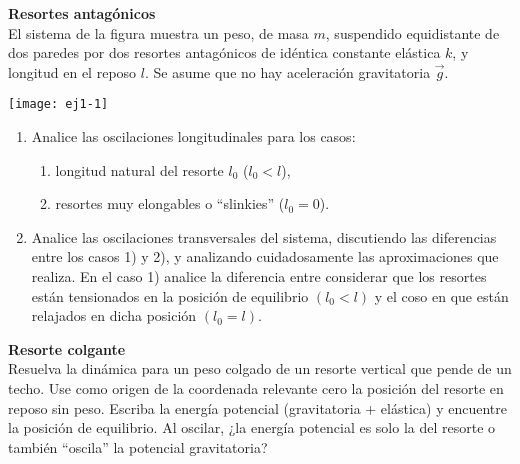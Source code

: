 \item
\begin{minipage}[t][1.9cm]{0.7\textwidth}
\textbf{Resortes antagónicos}\\
El sistema de la figura muestra un peso, de masa $m$, suspendido equidistante de dos paredes por dos resortes antagónicos de idéntica constante elástica $k$, y longitud en el reposo $l$.
Se asume que no hay aceleración gravitatoria $\vec{g}$.
\end{minipage}
\begin{minipage}[c][0cm][t]{0.25\textwidth}
  \texttt{[image: ej1-1]}
\end{minipage}
\begin{enumerate}
	\item Analice las oscilaciones longitudinales para los casos:   
	\begin{enumerate}
		\item longitud natural del resorte $l_0$ ($l_0 < l$),   
		\item resortes muy elongables o ``slinkies'' ($l_0 = 0$).   
	\end{enumerate}
	\item Analice las oscilaciones transversales del sistema, discutiendo las diferencias entre los casos 1) y 2), y analizando cuidadosamente las aproximaciones que realiza.
	En el caso 1) analice la diferencia entre considerar que los resortes están tensionados en la posición de equilibrio $(l_{0}<l)$ y el coso en que están relajados en dicha posición $(l_0= l)$.
\end{enumerate}



\item 
\textbf{Resorte colgante}\\
Resuelva la dinámica para un peso colgado de un resorte vertical que pende de un techo.
Use como origen de la coordenada relevante cero la posición del resorte en reposo sin peso.
Escriba la energía potencial (gravitatoria + elástica) y encuentre la posición de equilibrio.
Al oscilar, ¿la energía potencial es solo la del resorte o también ``oscila'' la potencial gravitatoria?
